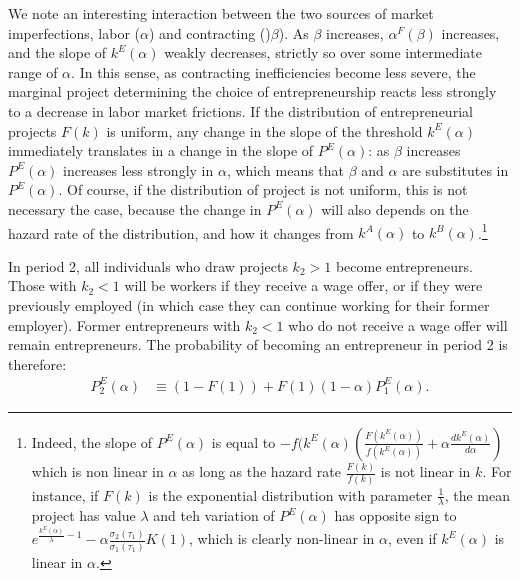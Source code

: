 \documentclass[12pt,american]{paper}
\theoremstyle{remark}
\begin{document}
We note an interesting interaction between the two sources of market imperfections, labor ($\alpha$) and contracting ()$\beta$). As $\beta$ increases, $\alpha^F(\beta)$ increases, and the slope of $k^E(\alpha)$ weakly decreases, strictly so over some intermediate range of $\alpha$. In this sense, as contracting inefficiencies become less severe, the marginal project determining the choice of entrepreneurship reacts less strongly to a decrease in labor market frictions. If the distribution of entrepreneurial projects $F(k)$ is uniform, any change in the slope of the threshold $k^E(\alpha)$ immediately translates in a change in the slope of $P^E(\alpha)$: as $\beta$ increases $P^E(\alpha)$ increases less strongly in $\alpha$, which means that $\beta$ and $\alpha$ are substitutes in $P^E(\alpha)$. Of course, if the distribution of project is not uniform, this is not necessary the case, because the change in $P^E(\alpha)$ will also depends on the hazard rate of the distribution, and how it changes from $k^A(\alpha)$ to $k^B(\alpha)$.\footnote{%
Indeed, the slope of $P^E(\alpha)$ is equal to $-f(k^E(\alpha)\left(\frac{F(k^E(\alpha))}{f(k^E(\alpha))} +\alpha\frac{dk^E(\alpha)}{d\alpha} \right)$ which is non linear in $\alpha$ as long as the hazard rate $\frac{F(k)}{f(k)}$ is not linear in $k$. For instance, if $F(k)$ is the exponential distribution with parameter $\frac{1}{\lambda}$, the mean project has value $\lambda$ and teh variation of $P^E(\alpha)$ has opposite sign to $e^{\frac{k^E(\alpha)}{\lambda}-1}-\alpha \frac{\sigma_2(\tau_1)}{\sigma_1(\tau_1)}K(1)$, which is clearly non-linear in $\alpha$, even if $k^E(\alpha)$ is linear in $\alpha$.
}



In period 2, all individuals who draw projects $k_2>1$ become entrepreneurs. Those with  $k_2<1$ will be workers if they receive a wage offer, or if they were previously employed (in which case they can continue working for their former employer). Former entrepreneurs with $k_2<1$ who do not receive  a wage offer will remain entrepreneurs.  The probability of becoming an entrepreneur in period 2 is therefore:
\begin{align*}
P_2^E(\alpha)&\equiv (1-F(1)) + F(1) (1-\alpha)P_1^E(\alpha). %
\end{align*}
\end{document}
